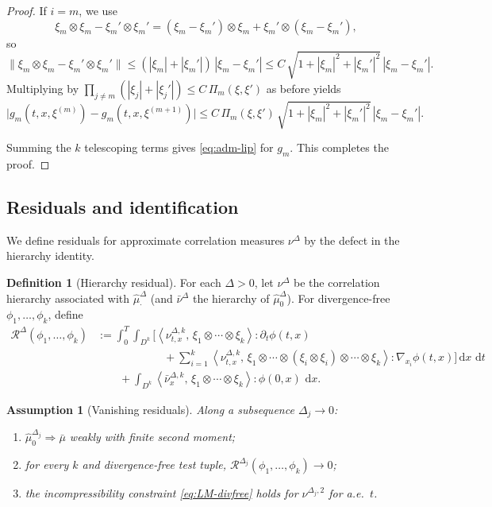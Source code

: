 \documentclass{article}
\numberwithin{equation}{section}
\theoremstyle{plain}
\newtheorem{assumption}[theorem]{Assumption}
\theoremstyle{definition}
\newtheorem{definition}[theorem]{Definition}
\theoremstyle{remark}
\newcommand{\dd}{\,\mathrm{d}}
\newcommand{\ip}[2]{\left\langle #1,\,#2 \right\rangle}
\begin{document}
\begin{proof}
If $i=m$, we use
\[
\xi_m\otimes\xi_m-\xi_m'\otimes\xi_m'
=(\xi_m-\xi_m')\otimes\xi_m+\xi_m'\otimes(\xi_m-\xi_m'),
\]
so
\[
\|\xi_m\otimes\xi_m-\xi_m'\otimes\xi_m'\|
\le (|\xi_m|+|\xi_m'|)\,|\xi_m-\xi_m'|
\le C\,\sqrt{1+|\xi_m|^2+|\xi_m'|^2}\,|\xi_m-\xi_m'|.
\]
Multiplying by $\prod_{j\ne m}(|\xi_j|+|\xi_j'|)\le C\,\Pi_m(\xi,\xi')$ as before yields
\[
\bigl|g_m(t,x,\xi^{(m)})-g_m(t,x,\xi^{(m+1)})\bigr|
\le
C\,\Pi_m(\xi,\xi')\,\sqrt{1+|\xi_m|^2+|\xi_m'|^2}\,|\xi_m-\xi_m'|.
\]

Summing the $k$ telescoping terms gives \eqref{eq:adm-lip} for $g_m$.
This completes the proof.
\end{proof}


\subsection{Residuals and identification}

We define residuals for approximate correlation measures $\nu^\Delta$ by the defect in the hierarchy identity.

\begin{definition}[Hierarchy residual]\label{def:hier-res}
For each $\Delta>0$, let $\nu^{\Delta}$ be the correlation hierarchy associated with $\widehat\mu^\Delta_\cdot$
(and $\bar\nu^\Delta$ the hierarchy of $\widehat\mu^\Delta_0$).
For divergence-free $\phi_1,\dots,\phi_k$, define
\begin{align}
\mathcal R^\Delta(\phi_1,\dots,\phi_k)
&:=
\int_0^T\int_{D^k}\Bigg[
\ip{\nu^{\Delta,k}_{t,x}}{\xi_1\otimes\cdots\otimes\xi_k}:\partial_t\phi(t,x)
\\
&\qquad\qquad\qquad
+\sum_{i=1}^k
\ip{\nu^{\Delta,k}_{t,x}}{\xi_1\otimes\cdots\otimes(\xi_i\otimes\xi_i)\otimes\cdots\otimes\xi_k}
:\nabla_{x_i}\phi(t,x)
\Bigg]\dd x\,\dd t \nonumber\\
&\qquad
+\int_{D^k}\ip{\bar\nu^{\Delta,k}_x}{\xi_1\otimes\cdots\otimes\xi_k}:\phi(0,x)\,\dd x. \nonumber\label{eq:residual}
\end{align}

\end{definition}

\begin{assumption}[Vanishing residuals]\label{ass:residuals}
Along a subsequence $\Delta_j\to0$:
\begin{enumerate}[label=(\roman*),leftmargin=2.2em]
\item $\widehat\mu^{\Delta_j}_0\Rightarrow\bar\mu$ weakly with finite second moment;
\item for every $k$ and divergence-free test tuple, $\mathcal R^{\Delta_j}(\phi_1,\dots,\phi_k)\to0$;
\item the incompressibility constraint \eqref{eq:LM-divfree} holds for $\nu^{\Delta_j,2}$ for a.e.\ $t$.
\end{enumerate}
\end{assumption}
\end{document}
